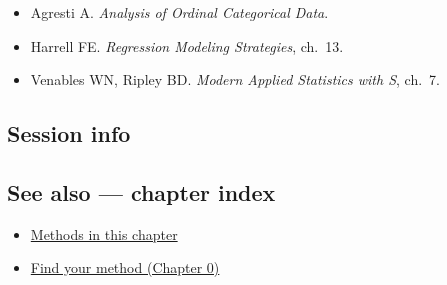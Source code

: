 \documentclass[
]{article}
\newenvironment{Shaded}{\begin{snugshade}}{\end{snugshade}}
\providecommand{\tightlist}{%
  \setlength{\itemsep}{0pt}\setlength{\parskip}{0pt}}
\begin{document}
\begin{itemize}
\tightlist
\item
  Agresti A. \emph{Analysis of Ordinal Categorical Data}.
\item
  Harrell FE. \emph{Regression Modeling Strategies}, ch.~13.
\item
  Venables WN, Ripley BD. \emph{Modern Applied Statistics with S},
  ch.~7.
\end{itemize}

\subsection{Session info}\label{session-info}

\begin{Shaded}
\begin{Highlighting}[]

\end{Highlighting}
\end{Shaded}

\subsection{See also --- chapter index}\label{see-also-chapter-index}

\begin{itemize}
\tightlist
\item
  \href{../index.Rmd}{Methods in this chapter}
\item
  \href{../../../ch00-find-your-method.Rmd}{Find your method (Chapter
  0)}
\end{itemize}
\end{document}
